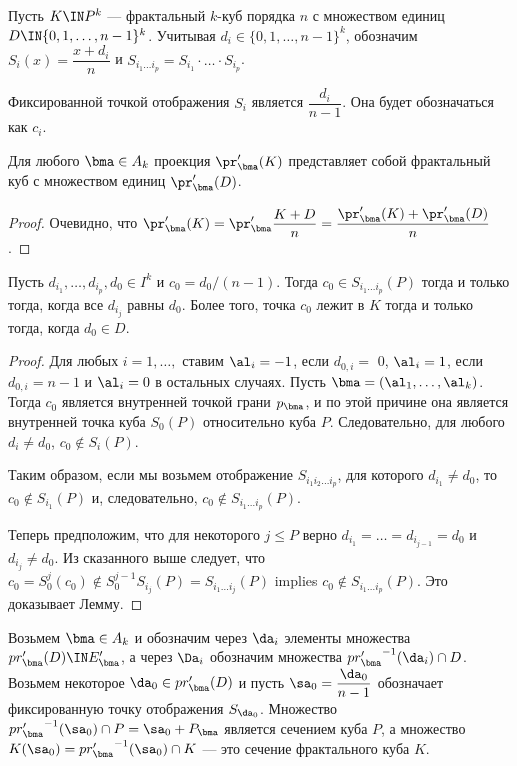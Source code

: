  
Пусть $K\IN P^k$ --- фрактальный $k$-куб порядка $n$ с множеством единиц $D\IN \{0,1,\ldots,n-1\}^k$.
Учитывая $d_i\in \{0,1,\ldots,n-1\}^k$, обозначим $S_i(x)=\dfrac{x+d_i}{n}$ и $S_{i_1\ldots i_p}=S_{i_1}\cdot\ldots \cdot S_{i_p}$.

Фиксированной точкой отображения $S_i$ является $\dfrac{d_i}{n-1}$. Она будет обозначаться как $c_i$.


\begin{lemma}\label{lem1}
Для любого $\bma\in A_k$ проекция $\pr'_{\bma}(K)$ представляет собой фрактальный куб с множеством единиц $\pr'_{\bma}(D)$.
\end{lemma}

\begin{proof} Очевидно, что
$\pr'_\bma(K)=\pr'_{\bma}\dfrac{K+D}{n}=\dfrac{\pr'_\bma(K) +\pr'_{\bma}(D)}{n}$.   
\end{proof}

\begin{proposition}\label{c0inK}
Пусть $d_{i_1},\ldots  ,d_{i_p},d_0\in I^k$ и
$c_0={d_0}/({n-1})$.
Тогда $c_0\in S_{i_1\ldots i_p}(P)$ тогда и только тогда, когда все $d_{i_j}$ равны $d_0$.
Более того, точка $c_0$ лежит в $K$ тогда и только тогда, когда $d_0\in D$.
\end{proposition}

\begin{proof}
Для любых $i=1,\ldots,$ ставим $\al_i=-1$, если $d_{0,i}=$ 0, $\al_i=1$, если $d_{0,i}=n-1$ и $\al_i=0$ в остальных случаях.
Пусть $\bma=(\al_1,\ldots,\al_k)$.
Тогда $c_0$ является внутренней точкой грани $p_\bma$, и по этой причине она является внутренней точка куба $S_0(P)$ относительно куба $P$. 
Следовательно, для любого $d_i\neq d_0$, $c_0\notin S_i(P)$.

Таким образом, если мы возьмем отображение $S_{i_1i_2\ldots i_p}$, для которого $d_{i_1}\neq d_0$, то $c_0\notin S_{i_1}(P)$ и, следовательно, $c_0\notin S_{i_1\ldots i_p}(P)$.

Теперь предположим, что для некоторого $j\le P$ верно $d_{i_1}=\ldots =d_{i_{j-1}}=d_0$ и $d_{i_j}\neq d_0$.
Из сказанного выше следует, что $c_0=S_0^j(c_0)\notin S_0^{j-1} S_{i_j}(P)=S_{i_1\ldots  i_j}(P)$ implies $c_0\notin S_{i_1\ldots  i_p}(P)$.
Это доказывает Лемму.
\end{proof}


Возьмем $\bma\in A_k$ и обозначим через $\da_i$ элементы
множества $pr'_\bma(D)\IN E'_\bma$, а через $\Da_i$ обозначим множества ${pr'_\bma}^{-1}(\da_i)\cap D$.
Возьмем некоторое $\da_0\in pr'_\bma(D)$ и пусть $\sa_0=\dfrac{\da_0}{n-1}$ обозначает фиксированную точку отображения $S_{\da_0}$.
Множество ${pr'_\bma}^{-1}(\sa_0)\cap P=\sa_0+P_\bma$ является сечением куба $P$, а множество $K(\sa_0)={pr'_\bma}^{-1}(\sa_0)\cap K$ --- это сечение фрактального куба $K$.

